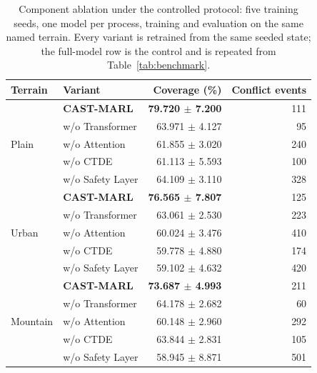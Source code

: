 \begin{table}[!t]

\centering
\caption{Component ablation under the controlled protocol: five training seeds, one model per process, training and evaluation on the same named terrain. Every variant is retrained from the same seeded state; the full-model row is the control and is repeated from Table~\ref{tab:benchmark}.}
\label{tab:module-ablation}
\footnotesize
\setlength{\tabcolsep}{4pt}
\begin{tabular}{llrr}
\toprule
Terrain & Variant & Coverage (\%) & Conflict events \\
\midrule
\multirow{5}{*}{Plain} & \textbf{CAST-MARL} & \textbf{79.720 $\pm$ 7.200} & 111 \\
 & w/o Transformer & 63.971 $\pm$ 4.127 & 95 \\
 & w/o Attention & 61.855 $\pm$ 3.020 & 240 \\
 & w/o CTDE & 61.113 $\pm$ 5.593 & 100 \\
 & w/o Safety Layer & 64.109 $\pm$ 3.110 & 328 \\
\midrule
\multirow{5}{*}{Urban} & \textbf{CAST-MARL} & \textbf{76.565 $\pm$ 7.807} & 125 \\
 & w/o Transformer & 63.061 $\pm$ 2.530 & 223 \\
 & w/o Attention & 60.024 $\pm$ 3.476 & 410 \\
 & w/o CTDE & 59.778 $\pm$ 4.880 & 174 \\
 & w/o Safety Layer & 59.102 $\pm$ 4.632 & 420 \\
\midrule
\multirow{5}{*}{Mountain} & \textbf{CAST-MARL} & \textbf{73.687 $\pm$ 4.993} & 211 \\
 & w/o Transformer & 64.178 $\pm$ 2.682 & 60 \\
 & w/o Attention & 60.148 $\pm$ 2.960 & 292 \\
 & w/o CTDE & 63.844 $\pm$ 2.831 & 105 \\
 & w/o Safety Layer & 58.945 $\pm$ 8.871 & 501 \\
\bottomrule
\end{tabular}
\end{table}